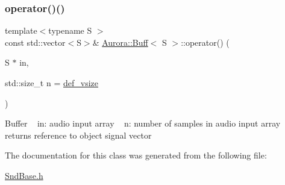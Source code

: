 \subsubsection{\texorpdfstring{operator()()}{operator()()}}
{\footnotesize\ttfamily template$<$typename S $>$ \\
const std\+::vector$<$S$>$\& \hyperlink{class_aurora_1_1_buff}{Aurora\+::\+Buff}$<$ S $>$\+::operator() (\begin{DoxyParamCaption}\item[{S $\ast$}]{in,  }\item[{std\+::size\+\_\+t}]{n = {\ttfamily \hyperlink{namespace_aurora_afaaddf667a06e7ce23c667a8b7295263}{def\+\_\+vsize}} }\end{DoxyParamCaption})\hspace{0.3cm}{\ttfamily [inline]}}

Buffer ~\newline
in\+: audio input array ~\newline
n\+: number of samples in audio input array ~\newline
returns reference to object signal vector 

The documentation for this class was generated from the following file\+:\begin{DoxyCompactItemize}
\item 
\hyperlink{_snd_base_8h}{Snd\+Base.\+h}\end{DoxyCompactItemize}
